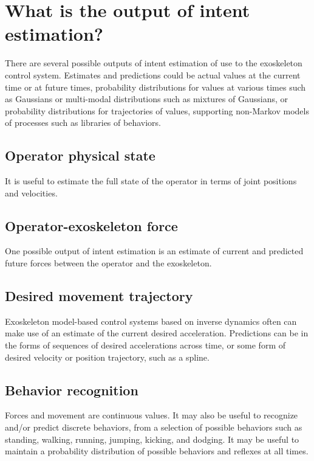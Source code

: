 \documentclass[letterpaper,12pt,fullpage]{article}
\begin{document}
\section{What is the output of intent estimation?}

There are several possible outputs of intent estimation of use to the
exoskeleton control system.
Estimates and predictions could be actual values at the current time or at
future times, probability distributions for
values at various times such as Gaussians or multi-modal distributions 
such as mixtures of Gaussians, or probability distributions for trajectories
of values, supporting non-Markov models of processes such as libraries
of behaviors.

\subsection{Operator physical state}

It is useful to estimate the full state of the operator in terms
of joint positions and velocities.

\subsection{Operator-exoskeleton force}

One possible output of intent estimation is an estimate of current
and predicted future forces between the operator and the exoskeleton.

\subsection{Desired movement trajectory}

Exoskeleton model-based control systems based on inverse dynamics often
can make use of an estimate of the current desired acceleration.
Predictions can be in the forms of sequences of desired accelerations
across time, or some form of desired velocity or position trajectory,
such as a spline.

\subsection{Behavior recognition}

Forces and movement are continuous values. It may also be useful to
recognize and/or predict discrete behaviors, from a selection of
possible behaviors such as 
standing, walking,
running, jumping, kicking, and dodging.
It may be useful to maintain a probability distribution of possible
behaviors and reflexes at all times.
\end{document}
